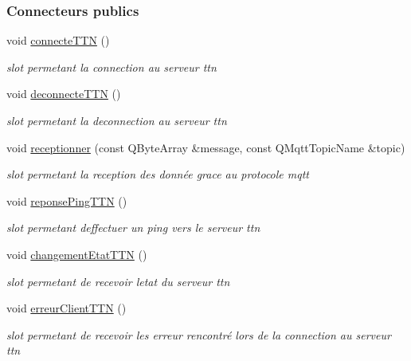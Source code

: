 \subsubsection*{Connecteurs publics}
\begin{DoxyCompactItemize}
\item 
void \hyperlink{class_communication_af71587fb1ee9b7460345b7c12372a1eb}{connecte\+T\+TN} ()
\begin{DoxyCompactList}\small\item\em slot permetant la connection au serveur ttn \end{DoxyCompactList}\item 
void \hyperlink{class_communication_ab0f5a47c2fc7dbca198bfab2c0ac65bb}{deconnecte\+T\+TN} ()
\begin{DoxyCompactList}\small\item\em slot permetant la deconnection au serveur ttn \end{DoxyCompactList}\item 
void \hyperlink{class_communication_a9a0c0ce96c86cbb3e59529b2334819f3}{receptionner} (const Q\+Byte\+Array \&message, const Q\+Mqtt\+Topic\+Name \&topic)
\begin{DoxyCompactList}\small\item\em slot permetant la reception des donnée grace au protocole mqtt \end{DoxyCompactList}\item 
void \hyperlink{class_communication_a2921a3a80cdcb10f7f63c3bd779d7129}{reponse\+Ping\+T\+TN} ()
\begin{DoxyCompactList}\small\item\em slot permetant d\textquotesingle{}effectuer un ping vers le serveur ttn \end{DoxyCompactList}\item 
void \hyperlink{class_communication_af249c498d61b4288b9e7d388baf81fc2}{changement\+Etat\+T\+TN} ()
\begin{DoxyCompactList}\small\item\em slot permetant de recevoir l\textquotesingle{}etat du serveur ttn \end{DoxyCompactList}\item 
void \hyperlink{class_communication_ae1a84ffd9317d0e4e27a6633cef43b64}{erreur\+Client\+T\+TN} ()
\begin{DoxyCompactList}\small\item\em slot permetant de recevoir les erreur rencontré lors de la connection au serveur ttn \end{DoxyCompactList}\end{DoxyCompactItemize}
